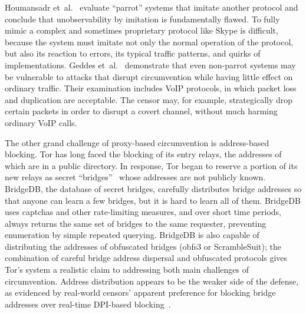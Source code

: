\documentclass[conference]{IEEEtran}
\begin{document}
Houmansadr et~al.~\cite{parrot} evaluate ``parrot'' systems that imitate another protocol
and conclude that unobservability by imitation is fundamentally flawed.
To fully mimic a complex and sometimes proprietary protocol like Skype
is difficult,
because the system must imitate not only the normal operation of the protocol,
but also its reaction to errors,
its typical traffic patterns, and quirks of implementations.
Geddes et~al.~\cite{acks}
demonstrate that even non-parrot systems may be vulnerable to
attacks that disrupt circumvention while having little effect
on ordinary traffic.
Their examination includes VoIP protocols,
in which packet loss and duplication are acceptable.
The censor may, for example, strategically drop certain packets
in order to disrupt a covert channel, without much harming ordinary VoIP calls.


The other grand challenge of proxy-based circumvention is address-based blocking.
Tor has long faced the blocking of its entry relays,
the addresses of which are in a public directory.
In response, Tor began to reserve a portion of its
new relays as secret ``bridges''~\cite{tor-blocking}
whose addresses are not publicly known.
BridgeDB, the database of secret bridges,
carefully distributes bridge addresses
so that anyone can learn a few bridges, but it is hard to learn all of them.
BridgeDB uses captchas and other rate-limiting measures,
and over short time periods,
always returns the same set of bridges to the same requester,
preventing enumeration by simple repeated querying.
BridgeDB is also capable of distributing the addresses
of obfuscated bridges (obfs3 or ScrambleSuit);
the combination
of careful bridge address dispersal and obfuscated protocols
gives Tor's system a realistic claim to addressing both main challenges of circumvention.
Address distribution appears to be the weaker side of the defense,
as evidenced by real-world censors' apparent preference for
blocking bridge addresses over real-time DPI-based blocking~\cite{foci12-winter}.
\end{document}

